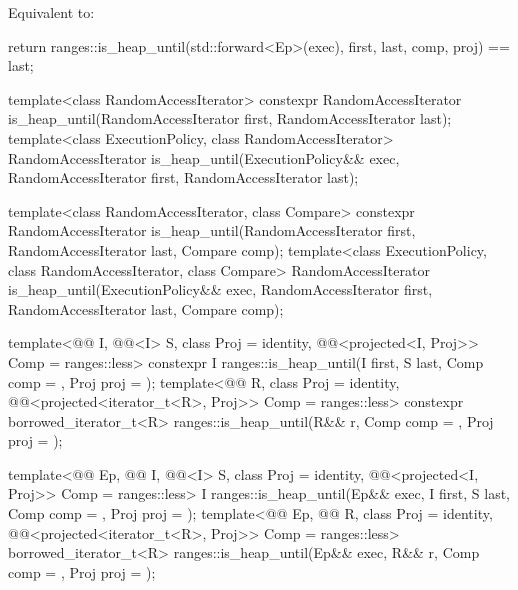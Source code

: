 \begin{itemdescr}
\pnum
\effects
Equivalent to:
\begin{codeblock}
return ranges::is_heap_until(std::forward<Ep>(exec), first, last, comp, proj) == last;
\end{codeblock}
\end{itemdescr}

%
\begin{itemdecl}
template<class RandomAccessIterator>
  constexpr RandomAccessIterator
    is_heap_until(RandomAccessIterator first, RandomAccessIterator last);
template<class ExecutionPolicy, class RandomAccessIterator>
  RandomAccessIterator
    is_heap_until(ExecutionPolicy&& exec,
                  RandomAccessIterator first, RandomAccessIterator last);

template<class RandomAccessIterator, class Compare>
  constexpr RandomAccessIterator
    is_heap_until(RandomAccessIterator first, RandomAccessIterator last,
                  Compare comp);
template<class ExecutionPolicy, class RandomAccessIterator, class Compare>
  RandomAccessIterator
    is_heap_until(ExecutionPolicy&& exec,
                  RandomAccessIterator first, RandomAccessIterator last,
                  Compare comp);

template<@@ I, @@<I> S, class Proj = identity,
         @@<projected<I, Proj>> Comp = ranges::less>
  constexpr I ranges::is_heap_until(I first, S last, Comp comp = {}, Proj proj = {});
template<@@ R, class Proj = identity,
         @@<projected<iterator_t<R>, Proj>> Comp = ranges::less>
  constexpr borrowed_iterator_t<R>
    ranges::is_heap_until(R&& r, Comp comp = {}, Proj proj = {});

template<@@ Ep, @@ I, @@<I> S,
         class Proj = identity,
         @@<projected<I, Proj>> Comp = ranges::less>
  I ranges::is_heap_until(Ep&& exec, I first, S last, Comp comp = {}, Proj proj = {});
template<@@ Ep, @@ R, class Proj = identity,
         @@<projected<iterator_t<R>, Proj>> Comp = ranges::less>
  borrowed_iterator_t<R>
    ranges::is_heap_until(Ep&& exec, R&& r, Comp comp = {}, Proj proj = {});
\end{itemdecl}

